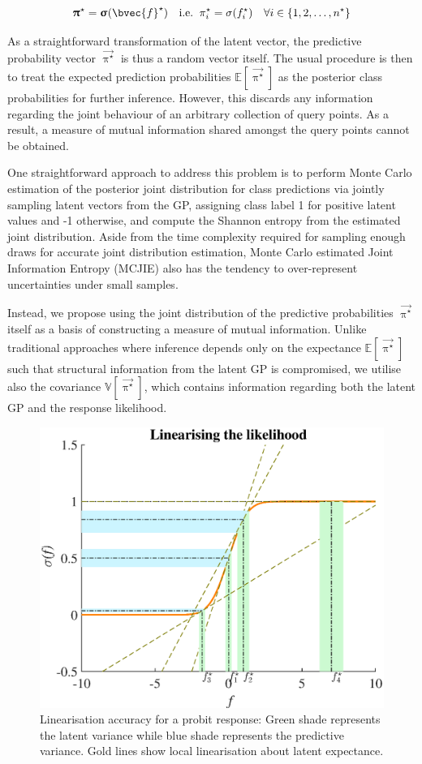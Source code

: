 			\begin{equation}
				\vec{\uppi}^{\star} = \vec{\upsigma}(\bvec{f}^{\star})\mathrm{ \quad i.e. \;\;}\pi^{\star}_{i} = \sigma(f^{\star}_{i}) \quad \forall i \in \{1, 2, \dots, n^{\star}\}
			\label{Section:LinearisedEntropy:Equation:Response}
			\end{equation}
			
			As a straightforward transformation of the latent vector, the predictive probability vector $\vec{\uppi^{\star}}$ is thus a random vector itself. The usual procedure is then to treat the expected prediction probabilities $\mathbb{E}[\vec{\uppi^{\star}}]$ as the posterior class probabilities for further inference. However, this discards any information regarding the joint behaviour of an arbitrary collection of query points. As a result, a measure of mutual information shared amongst the query points cannot be obtained.
			
			One straightforward approach to address this problem is to perform Monte Carlo estimation of the posterior joint distribution for class predictions via jointly sampling latent vectors from the GP, assigning class label 1 for positive latent values and -1 otherwise, and compute the Shannon entropy \cite{ShannonEntropy} from the estimated joint distribution. Aside from the time complexity required for sampling enough draws for accurate joint distribution estimation, Monte Carlo estimated Joint Information Entropy (MCJIE) also has the tendency to over-represent uncertainties under small samples.
					
			Instead, we propose using the joint distribution of the predictive probabilities $\vec{\uppi^{\star}}$ itself as a basis of constructing a measure of mutual information. Unlike traditional approaches where inference depends only on the expectance $\mathbb{E}[\vec{\uppi^{\star}}]$ such that structural information from the latent GP is compromised, we utilise also the covariance $\mathbb{V}[\vec{\uppi^{\star}}]$, which contains information regarding both the latent GP and the response likelihood.
		
			\begin{figure}[!htbp]
				\centering
					\includegraphics[width = 0.6\linewidth]{Figures/linearisation.eps}
				\caption{Linearisation accuracy for a probit response: Green shade represents the latent variance while blue shade represents the predictive variance. Gold lines show local linearisation about latent expectance.}
				\label{Figure:Linearisation}
			\end{figure}
				

